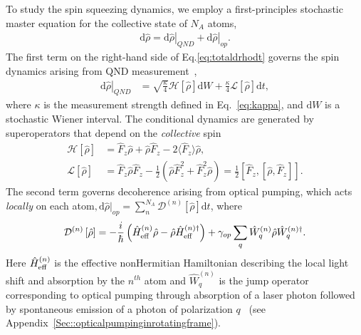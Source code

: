 \documentclass[preprint,aps,pra,onecolumn,superscriptaddress]{revtex4-1} %
\newcommand{\expect}[1]{\big\langle #1 \big\rangle}
\begin{document}
To study the spin squeezing dynamics, we employ a first-principles stochastic master equation for the collective state of $N_A$ atoms,
\begin{align}\label{eq:totaldrhodt}
\mathrm{d}\hat{\rho}= \left.\mathrm{d}\hat{\rho}\right|_{QND}+\left.\mathrm{d}\hat{\rho}\right|_{op}.
\end{align}
The first term on the right-hand side of Eq.\eqref{eq:totaldrhodt} governs the spin dynamics arising from QND measurement~\cite{Jacobs2006,Baragiola2014},
\begin{align}
\left.\mathrm{d}\hat{\rho}\right|_{QND} &= \sqrt{\frac{\kappa}{4}}\mathcal{H}\left[\hat{\rho} \right]\mathrm{d}W + \frac{\kappa}{4}\mathcal{L}\left[ \hat{\rho}\right]\mathrm{d}t, 
\end{align}
where  $\kappa$ is the measurement strength defined in Eq.~\eqref{eq:kappa}, and $\mathrm{d}W$ is a stochastic Wiener interval. The conditional dynamics are generated by superoperators that depend on the {\em collective} spin
\begin{subequations}
\begin{align}
\mathcal{H}\left[ \hat{\rho}\right] &= \hat{F}_z \hat{\rho} + \hat{\rho}\hat{F}_z -2\expect{\hat{F}_z}\hat{\rho}, \\
\mathcal{L}\left[ \hat{\rho} \right] &= \hat{F}_z \hat{\rho}\hat{F}_z -\frac{1}{2}\left(\hat{\rho}\hat{F}_z^2+\hat{F}_z^2\hat{\rho} \right)=\frac{1}{2}\left[\hat{F}_z,\left[\hat{\rho},\hat{F}_z \right] \right].
\end{align}
\end{subequations}
The second term governs decoherence arising from optical pumping, which acts {\em locally} on each atom$,\mathrm{d}\hat{\rho}|_{op}=\sum_n^{N_A} \mathcal{D}^{(n)}\left[ \hat{\rho}\right] \mathrm{d}t$, where 
\begin{equation}
\mathcal{D}^{(n)}\left[ \hat{\rho}\right] = -\frac{i}{\hbar}\left(\hat{H}^{(n)}_{\rm eff}\hat{\rho} - \hat{\rho} \hat{H}^{(n)\dag}_{\rm eff}\right) + \gamma_{op} \sum_q \hat{W}^{(n)}_q \hat{\rho}\hat{W}^{(n)\dag}_q.
\label{op_superator}
\end{equation}
Here $\hat{H}^{(n)}_{\rm eff}$ is the effective nonHermitian Hamiltonian describing the local light shift and absorption by the $n^{th}$ atom and $\hat{W}^{(n)}_q$ is the jump operator corresponding to optical pumping through absorption of a laser photon followed by spontaneous emission of a photon of polarization $q$~\cite{Deutsch2010a} (see Appendix~\ref{Sec::opticalpumpinginrotatingframe}).   
\end{document}
